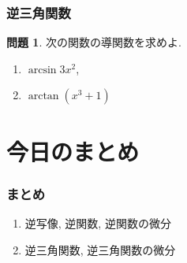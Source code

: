 \documentclass[dvipdfmx,cjk,10.2pt]{beamer}
\theoremstyle{definition}
\newtheorem{Prob}[Thm]{問題}
\begin{document}


\begin{frame}
\frametitle{逆三角関数}

\begin{Prob}
次の関数の導関数を求めよ. 
\begin{enumerate}
\item $\arcsin 3x^2$, 
\item $\arctan (x^3+1)$
\end{enumerate}
\end{Prob}

\end{frame}










\section{今日のまとめ}
\begin{frame}
\frametitle{まとめ}   

\begin{enumerate}
\item 逆写像, 逆関数, 逆関数の微分
\item 逆三角関数, 逆三角関数の微分
\end{enumerate} 




\end{frame}
\end{document}
